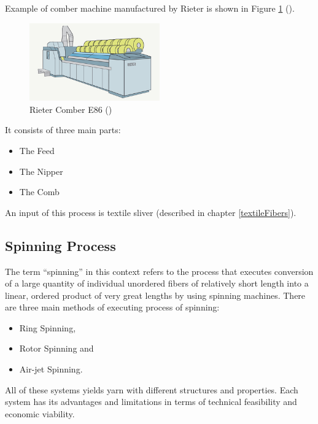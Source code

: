 \documentclass[twoside]{ctuthesis}
\theoremstyle{plain}
\theoremstyle{definition}
\theoremstyle{note}
\begin{document}
Example of comber machine manufactured by Rieter is shown in Figure \ref{fig:rieterComber} (\cite{cite:RIKIpedia_combing}).
\begin{figure}[h]
	\centering
	\includegraphics[width=0.5\textwidth]{Rieter_comber.jpg}
	\caption{Rieter Comber E86 (\cite{cite:RIKIpedia_combing})}
	\label{fig:rieterComber}
\end{figure}

It consists of three main parts: 
\begin{itemize}
	\setlength{\itemsep}{5pt}
\item The Feed

\item The Nipper

\item The Comb
\end{itemize}
An input of this process is textile sliver (described in chapter \ref{textileFibers}).
\subsection{Spinning Process}
\label{spinningProcesses}
The term “spinning” in this context refers to the process that executes conversion of a large quantity of individual unordered fibers of relatively short length into a linear, ordered product of very great lengths by using spinning machines. There are three main methods of executing process of spinning:
\begin{itemize}
	\setlength{\itemsep}{5pt}
\item Ring Spinning,

\item Rotor Spinning and

\item Air-jet Spinning.
\end{itemize}
All of these systems yields yarn with different structures and properties. Each system has its advantages and limitations in terms of technical feasibility and economic viability.
\end{document}

